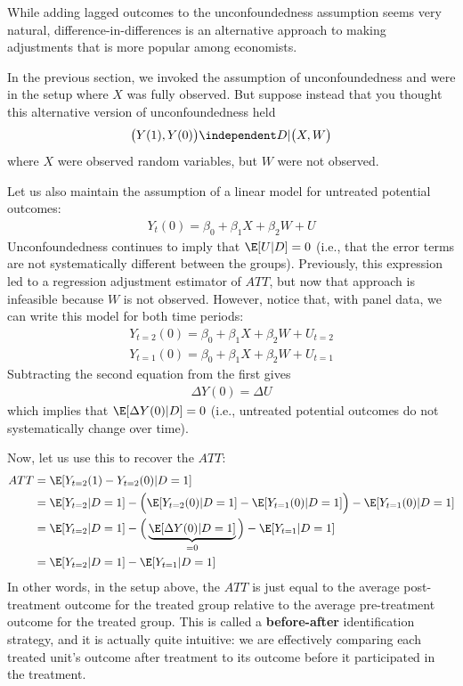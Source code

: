 \documentclass[
  letterpaper,
  DIV=11,
  numbers=noendperiod]{scrreprt}
\begin{document}
While adding lagged outcomes to the unconfoundedness assumption seems
very natural, difference-in-differences is an alternative approach to
making adjustments that is more popular among economists.

In the previous section, we invoked the assumption of unconfoundedness
and were in the setup where \(X\) was fully observed. But suppose
instead that you thought this alternative version of unconfoundedness
held \begin{align*}
  \big(Y(1),Y(0)\big) \independent D | \big(X,W\big)
\end{align*} where \(X\) were observed random variables, but \(W\) were
not observed.

Let us also maintain the assumption of a linear model for untreated
potential outcomes: \begin{align*}
  Y_t(0) = \beta_0 + \beta_1 X + \beta_2 W + U
\end{align*} Unconfoundedness continues to imply that \(\E[U|D] = 0\)
(i.e., that the error terms are not systematically different between the
groups). Previously, this expression led to a regression adjustment
estimator of \(ATT\), but now that approach is infeasible because \(W\)
is not observed. However, notice that, with panel data, we can write
this model for both time periods: \begin{align*}
  Y_{t=2}(0) = \beta_0 + \beta_1 X + \beta_2 W + U_{t=2} \\
  Y_{t=1}(0) = \beta_0 + \beta_1 X + \beta_2 W + U_{t=1}
\end{align*} Subtracting the second equation from the first gives
\begin{align*}
  \Delta Y(0) = \Delta U
\end{align*} which implies that \(\E[\Delta Y(0) | D] = 0\) (i.e.,
untreated potential outcomes do not systematically change over time).

Now, let us use this to recover the \(ATT\): \begin{align*}
  ATT &= \E[Y_{t=2}(1) - Y_{t=2}(0) | D=1] \\
      &= \E[Y_{t=2} | D=1] - \Big(\E[Y_{t=2}(0) | D=1] - \E[Y_{t=1}(0) | D=1]\Big) - \E[Y_{t=1}(0) | D=1] \\
      &= \E[Y_{t=2} | D=1] - \Big(\underbrace{\E[\Delta Y(0) | D=1]}_{=0}\Big) - \E[Y_{t=1} | D=1] \\
      &= \E[Y_{t=2} | D=1] - \E[Y_{t=1} | D=1]
\end{align*} In other words, in the setup above, the \(ATT\) is just
equal to the average post-treatment outcome for the treated group
relative to the average pre-treatment outcome for the treated group.
This is called a \textbf{before-after} identification strategy, and it
is actually quite intuitive: we are effectively comparing each treated
unit's outcome after treatment to its outcome before it participated in
the treatment.
\end{document}
